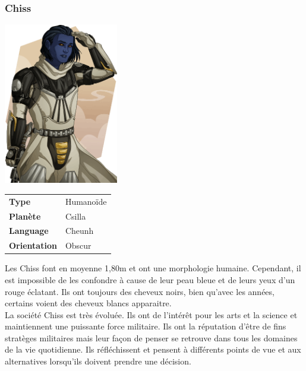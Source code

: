\subsubsection{Chiss}
\includegraphics[width=5cm]{img/races/chiss.png}

\vspace{-9\baselineskip}

\begin{flushright}
\begin{tabular}{ l l }
	\textbf{Type} 			& Humanoïde \\
   	\textbf{Planète} 		& Csilla \\
   	\textbf{Language} 		& Cheunh \\
   	\textbf{Orientation} 	& Obscur \\
\end{tabular}
\end{flushright}

\vspace{4\baselineskip}

Les Chiss font en moyenne 1,80m et ont une morphologie humaine. Cependant, il est impossible de les confondre à cause de leur peau bleue et de leurs yeux d’un rouge éclatant. Ils ont toujours des cheveux noirs, bien qu’avec les années, certains voient des cheveux blancs apparaitre. \\ 

La société Chiss est très évoluée. Ils ont de l’intérêt pour les arts et la science et maintiennent une puissante force militaire. Ils ont la réputation d’être de fins stratèges militaires mais leur façon de penser se retrouve dans tous les domaines de la vie quotidienne. Ils réfléchissent et pensent à différents points de vue et aux alternatives lorsqu’ils doivent prendre une décision.  

